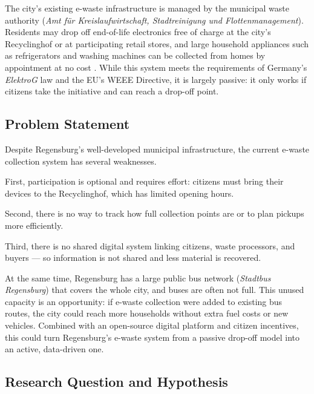 \documentclass[12pt, a4paper]{article}
\begin{document}
The city's existing e-waste infrastructure is managed by the municipal waste
authority (\textit{Amt für Kreislaufwirtschaft, Stadtreinigung und
Flottenmanagement}). Residents may drop off end-of-life electronics free of charge
at the city's Recyclinghof or at participating retail stores, and large household
appliances such as refrigerators and washing machines can be collected from homes
by appointment at no cost \cite{regensburg_elektroschrott}. While this system meets the requirements of Germany's
\textit{ElektroG} law and the EU's WEEE Directive, it is largely passive:
it only works if citizens take the initiative and can reach a drop-off point.

\subsection{Problem Statement}

Despite Regensburg's well-developed municipal infrastructure, the current e-waste
collection system has several weaknesses.

First, participation is optional and requires effort: citizens must bring their devices to the
Recyclinghof, which has limited opening hours.

Second, there is no way to track how full collection points are or to plan pickups more efficiently.

Third, there is no shared digital system linking citizens, waste processors, and buyers ---
so information is not shared and less material is recovered.

At the same time, Regensburg has a large public bus network
(\textit{Stadtbus Regensburg}) that covers the whole city,
and buses are often not full. This unused capacity is an opportunity:
if e-waste collection were added to existing bus routes, the city could reach more households
without extra fuel costs or new vehicles. Combined with an open-source digital platform
and citizen incentives, this could turn Regensburg's e-waste system from a passive drop-off
model into an active, data-driven one.

\subsection{Research Question and Hypothesis}
\end{document}
